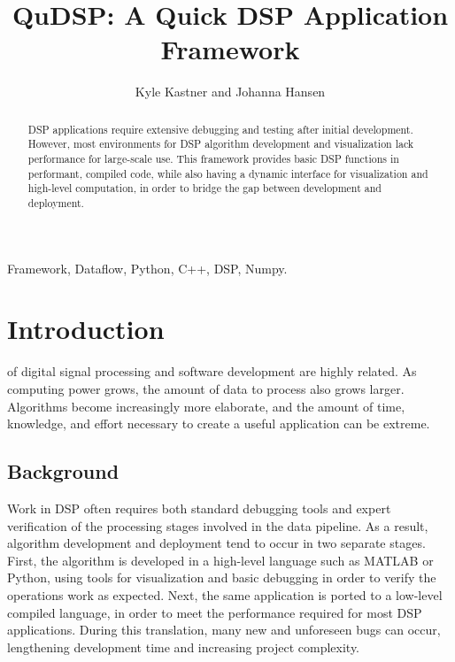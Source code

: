 \documentclass[journal]{IEEEtran}
\begin{document}
\title{QuDSP: A Quick DSP Application Framework}

\author{Kyle Kastner and Johanna Hansen}%

\maketitle

\begin{abstract}
DSP applications require extensive debugging and testing after initial development. However, most environments 
for DSP algorithm development and visualization lack performance for large-scale use.
This framework provides basic DSP functions in performant, compiled code, while also having a dynamic
interface for visualization and high-level computation, in order to bridge the gap between development and deployment. 
\end{abstract}

\begin{IEEEkeywords}
Framework, Dataflow, Python, C++, DSP, Numpy.
\end{IEEEkeywords}

\IEEEpeerreviewmaketitle
\section{Introduction}
 of digital signal processing and software development are highly related. As computing power
grows, the amount of data to process also grows larger. Algorithms become increasingly more elaborate, and the amount of time, knowledge,
and effort necessary to create a useful application can be extreme.

\subsection{Background}
Work in DSP often requires both standard debugging tools and expert verification of the processing stages involved 
in the data pipeline. As a result, algorithm development and deployment tend to occur in two separate stages.
First, the algorithm is developed in a high-level language such as MATLAB or Python, using tools for visualization 
and basic debugging in order to verify the operations work as expected. Next, the same application is ported to a low-level compiled
language, in order to meet the performance required for most DSP applications. During this translation, many new and
unforeseen bugs can occur, lengthening development time and increasing project complexity. 
\end{document}
